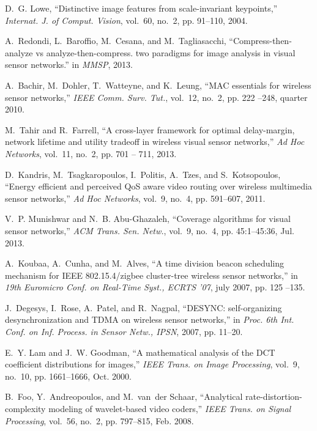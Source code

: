 \documentclass[twocolumn,english]{IEEEtran}
\theoremstyle{plain}
\theoremstyle{definition}
\begin{document}
\begin{thebibliography}{10}
D.~G. Lowe, ``Distinctive image features from scale-invariant keypoints,''
  \emph{Internat. J. of Comput. Vision}, vol.~60, no.~2, pp. 91--110, 2004.

A.~Redondi, L.~Baroffio, M.~Cesana, and M.~Tagliasacchi,
  ``Compress-then-analyze vs analyze-then-compress. two paradigms for image
  analysis in visual sensor networks.'' in \emph{MMSP}, 2013.

A.~Bachir, M.~Dohler, T.~Watteyne, and K.~Leung, ``{MAC} essentials for
  wireless sensor networks,'' \emph{IEEE Comm. Surv. Tut.}, vol.~12, no.~2, pp.
  222 --248, quarter 2010.

M.~Tahir and R.~Farrell, ``A cross-layer framework for optimal delay-margin,
  network lifetime and utility tradeoff in wireless visual sensor networks,''
  \emph{Ad Hoc Networks}, vol.~11, no.~2, pp. 701 -- 711, 2013.

D.~Kandris, M.~Tsagkaropoulos, I.~Politis, A.~Tzes, and S.~Kotsopoulos,
  ``Energy efficient and perceived {QoS} aware video routing over wireless
  multimedia sensor networks,'' \emph{Ad Hoc Networks}, vol.~9, no.~4, pp.
  591--607, 2011.

V.~P. Munishwar and N.~B. Abu-Ghazaleh, ``Coverage algorithms for visual sensor
  networks,'' \emph{ACM Trans. Sen. Netw.}, vol.~9, no.~4, pp. 45:1--45:36,
  Jul. 2013.

A.~Koubaa, A.~Cunha, and M.~Alves, ``A time division beacon scheduling
  mechanism for {IEEE} 802.15.4/zigbee cluster-tree wireless sensor networks,''
  in \emph{19th Euromicro Conf. on Real-Time Syst., ECRTS '07}, july 2007, pp.
  125 --135.

J.~Degesys, I.~Rose, A.~Patel, and R.~Nagpal, ``{DESYNC}: self-organizing
  desynchronization and {TDMA} on wireless sensor networks,'' in \emph{Proc.
  6th Int. Conf. on Inf. Process. in Sensor Netw., IPSN}, 2007, pp. 11--20.

E.~Y. Lam and J.~W. Goodman, ``A mathematical analysis of the {DCT} coefficient
  distributions for images,'' \emph{IEEE Trans. on Image Processing}, vol.~9,
  no.~10, pp. 1661--1666, Oct. 2000.

B.~Foo, Y.~Andreopoulos, and M.~van~der Schaar, ``Analytical
  rate-distortion-complexity modeling of wavelet-based video coders,''
  \emph{IEEE Trans. on Signal Processing}, vol.~56, no.~2, pp. 797--815, Feb.
  2008.


\end{thebibliography}
\end{document}
